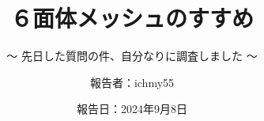 %
\title{６面体メッシュのすすめ}
\subtitle{～ 先日した質問の件、自分なりに調査しました ～}
%
%
%
\date[Sep.8th,2024]{報告日：2024年9月8日}
\author[ichmy55]{報告者：ichmy55}
\subject{Usage example of PrePoMax}
